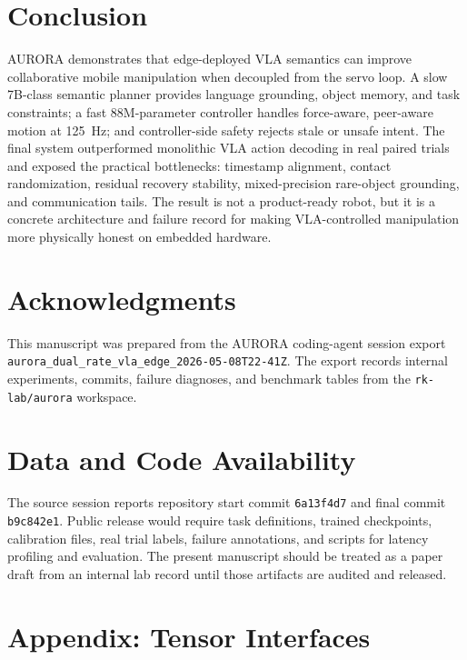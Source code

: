 \documentclass[10pt,twocolumn]{article}
\begin{document}
\section{Conclusion}

AURORA demonstrates that edge-deployed VLA semantics can improve collaborative mobile manipulation when decoupled from the servo loop. A slow 7B-class semantic planner provides language grounding, object memory, and task constraints; a fast 88M-parameter controller handles force-aware, peer-aware motion at \SI{125}{Hz}; and controller-side safety rejects stale or unsafe intent. The final system outperformed monolithic VLA action decoding in real paired trials and exposed the practical bottlenecks: timestamp alignment, contact randomization, residual recovery stability, mixed-precision rare-object grounding, and communication tails. The result is not a product-ready robot, but it is a concrete architecture and failure record for making VLA-controlled manipulation more physically honest on embedded hardware.

\section*{Acknowledgments}

This manuscript was prepared from the AURORA coding-agent session export \texttt{aurora\_dual\_rate\_vla\_edge\_2026-05-08T22-41Z}. The export records internal experiments, commits, failure diagnoses, and benchmark tables from the \texttt{rk-lab/aurora} workspace.

\section*{Data and Code Availability}

The source session reports repository start commit \texttt{6a13f4d7} and final commit \texttt{b9c842e1}. Public release would require task definitions, trained checkpoints, calibration files, real trial labels, failure annotations, and scripts for latency profiling and evaluation. The present manuscript should be treated as a paper draft from an internal lab record until those artifacts are audited and released.




\appendix

\section{Appendix: Tensor Interfaces}
\end{document}
